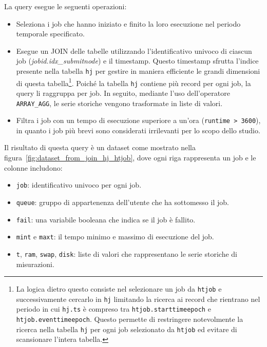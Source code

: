 La query esegue le seguenti operazioni:
\begin{itemize}
    \item Seleziona i job che hanno iniziato e finito la loro esecuzione nel
        periodo temporale specificato.
    \item Esegue un JOIN delle tabelle utilizzando l'identificativo univoco di
        ciascun job (\textit{jobid.idx\_submitnode}) e il timestamp. Questo
        timestamp sfrutta l'indice presente nella tabella
        \texttt{hj} per gestire in maniera efficiente le grandi dimensioni di
        questa tabella\footnote{La logica dietro questo consiste
            nel selezionare un job da \texttt{htjob} e successivamente
            cercarlo in \texttt{hj} limitando la ricerca ai record che
            rientrano nel periodo in cui \texttt{hj.ts} è compreso tra
            \texttt{htjob.starttimeepoch} e \texttt{htjob.eventtimeepoch}.
            Questo permette di restringere notevolmente la ricerca nella
            tabella \texttt{hj} per ogni job selezionato da \texttt{htjob} ed
        evitare di scansionare l'intera tabella.}. Poiché la tabella \texttt{hj} contiene più record per
        ogni job, la query li raggruppa per job. In seguito, mediante l'uso
        dell'operatore \verb|ARRAY_AGG|, le serie storiche vengono trasformate
        in liste di valori.
    \item Filtra i job con un tempo di esecuzione superiore a un'ora
        (\verb|runtime > 3600|), in quanto i job più brevi sono considerati
        irrilevanti per lo scopo dello studio.
\end{itemize}

Il risultato di questa query è un dataset come mostrato nella
figura~\ref{fig:dataset_from_join_hj_htjob}, dove ogni riga rappresenta un job
e le colonne includono: 

\begin{itemize}
    \item \texttt{job}: identificativo univoco per ogni job.
    \item \texttt{queue}: gruppo di appartenenza dell'utente che ha sottomesso
        il job.
    \item \texttt{fail}: una variabile booleana che indica se il job è fallito.
    \item \texttt{mint} e \texttt{maxt}: il tempo minimo e massimo di
        esecuzione del job.
    \item \texttt{t}, \texttt{ram}, \texttt{swap}, \texttt{disk}: liste di
        valori che rappresentano le serie storiche di misurazioni.
\end{itemize}

